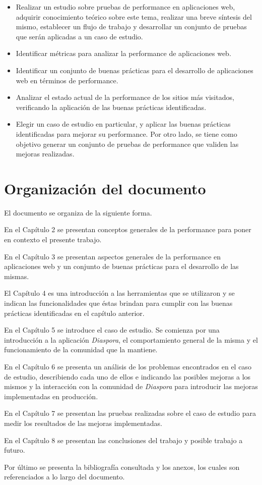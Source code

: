 \begin{itemize}

\item Realizar un estudio sobre pruebas de performance en aplicaciones web, adquirir conocimiento teórico sobre este tema, realizar una breve síntesis del mismo, establecer un 
flujo de trabajo y desarrollar un conjunto de pruebas que serán aplicadas a un caso de estudio.

\item Identificar métricas para analizar la performance de aplicaciones web.

\item Identificar un conjunto de buenas prácticas para el desarrollo de aplicaciones web en términos de performance.

\item Analizar el estado actual de la performance de los sitios más visitados, verificando la aplicación de las buenas prácticas identificadas.

\item Elegir un caso de estudio en particular, y aplicar las buenas prácticas identificadas para mejorar su performance. Por otro lado, se tiene como objetivo generar un conjunto de pruebas de performance que validen las mejoras realizadas.

\end{itemize}

\section{Organización del documento}
\label{capitulo1:organizacion}

El documento se organiza de la siguiente forma.

En el Capítulo 2 se presentan conceptos generales de la performance para poner en contexto el presente trabajo.

En el Capítulo 3 se presentan aspectos generales de la performance en aplicaciones web y un conjunto de buenas prácticas para el desarrollo de las mismas.

El Capítulo 4 es una introducción a las herramientas que se utilizaron y se indican las funcionalidades que éstas brindan para cumplir con las buenas prácticas identificadas en el capítulo 
anterior.

En el Capítulo 5 se introduce el caso de estudio. Se comienza por una introducción a la aplicación \emph{Diaspora}, el comportamiento general de la misma y el funcionamiento de la 
comunidad que la mantiene.

En el Capítulo 6 se presenta un análisis de los problemas encontrados en el caso de estudio, describiendo cada uno de ellos e indicando las posibles mejoras a los mismos y la 
interacción con la comunidad de \emph{Diaspora} para introducir las mejoras implementadas en producción.

En el Capítulo 7 se presentan las pruebas realizadas sobre el caso de estudio para medir los resultados de las mejoras implementadas.

En el Capítulo 8 se presentan las conclusiones del trabajo y posible trabajo a futuro.

Por último se presenta la bibliografía consultada y los anexos, los cuales son referenciados a lo largo del documento.
